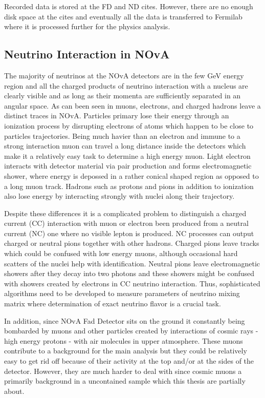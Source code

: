 Recorded data is stored at the FD and ND cites. However, there are no enough disk space at the cites and
eventually all the data is transferred to Fermilab where it is processed further for the physics analysis.

\subsection{Neutrino Interaction in NOvA}
The majority of neutrinos at the NOvA detectors are in the few GeV energy region and all the charged 
products of neutrino interaction with a nucleus are clearly visible and as long as their momenta are 
sufficiently separated in an angular space. As can been seen in \p{} muons, electrons, and charged 
hadrons leave a distinct traces in NOvA. Particles primary lose their energy through an ionization 
process by disrupting electrons of atoms which happen to be close to particles trajectories. Being 
much havier than an electron and immune to a strong interaction muon can travel a long distance inside 
the detectors which make it a relatively easy task to determine a high energy muon. Light electron interacts
with detector material via pair production and forms electromagnetic shower, where energy is depossed in 
a rather conical shaped region as opposed to a long muon track. Hadrons such as protons and pions in 
addition to ionization also lose energy by interacting strongly with nuclei along their trajectory. 

Despite these differences it is a complicated problem to distinguish a charged current (CC) interaction with 
muon or electron been produced from a neutral current (NC) one where no visible lepton is produced.
NC processes can output charged or neutral pions together with other hadrons. Charged pions
leave tracks which could be confused with low energy muons, although occasional hard scatters of the 
nuclei help with identification. Neutral pions leave electromagnetic showers after they decay into two
photons and these showers might be confused with showers created by electrons in CC neutrino interaction.
Thus, sophisticated algorithms need to be developed to measure parameters of neutrino mixing matrix where 
determination of exact neutrino flavor is a crucial task.

In addition, since NOvA Fad Detector sits on the ground it constantly being bombarded by muons and other
particles created by interactions of cosmic rays - high energy protons - with air molecules in upper atmosphere. 
These muons contribute to a background for the main analysis but they could be relatively easy to get rid off
because of their activity at the top and/or at the sides of the detector. However, they are much harder to deal
with since cosmic muons a primarily background in a uncontained sample which this thesis are partially about.

